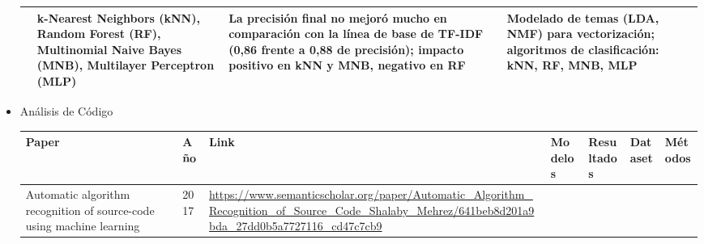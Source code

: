 \documentclass{article}
\begin{document}
\begin{itemize}
\begin{longtable}{|p{2cm}|p{0.8cm}|p{2cm}|p{2cm}|p{3cm}|p{2cm}|p{3cm}|}
                             & k-Nearest Neighbors (kNN), Random Forest (RF), Multinomial Naive Bayes (MNB), Multilayer Perceptron (MLP) 
                             & La precisión final no mejoró mucho en comparación con la línea de base de TF-IDF (0,86 frente a 0,88 de precisión); impacto positivo en kNN y MNB, negativo en RF 
                             & 
                             & Modelado de temas (LDA, NMF) para vectorización; algoritmos de clasificación: kNN, RF, MNB, MLP                                                                                                                                                                      \\
              
              \hline
              
          \end{longtable}
          
    \item Análisis de Código
          
          \begin{longtable}{|p{2cm}|p{0.8cm}|p{2cm}|p{2cm}|p{3cm}|p{2cm}|p{3cm}|}
              \hline
              \textbf{Paper} & \textbf{Año}                                                                                                                                                                                                                                                                                               & \textbf{Link} & \textbf{Modelos} & \textbf{Resultados} & \textbf{Dataset} & \textbf{Métodos} \\
              \hline
              \endfirsthead
              
              \hline
              \endfoot
              
              \hline
              \endlastfoot
              
              
              Automatic algorithm recognition of source-code using machine
              learning
                             & 2017
                             & \href{https://www.semanticscholar.org/paper/Automatic_Algorithm_Recognition_of_Source_Code_Shalaby_Mehrez/641beb8d201a9bda_27dd0b5a7727116_cd47c7cb9}{\url{https://www.semanticscholar.org/paper/Automatic_Algorithm_Recognition_of_Source_Code_Shalaby_Mehrez/641beb8d201a9bda_27dd0b5a7727116_cd47c7cb9}}

              
              
              
              

\end{longtable}
\end{itemize}
\end{document}
